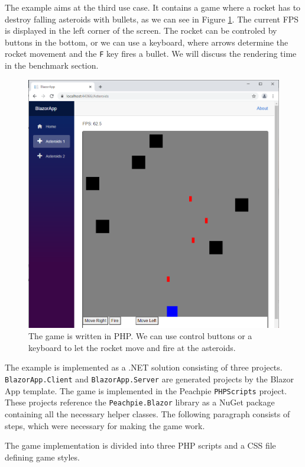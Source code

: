 The example aims at the third use case.
It contains a game where a rocket has to destroy falling asteroids with bullets, as we can see in Figure \ref{img28:game}.
The current \ac{FPS} is displayed in the left corner of the screen.
The rocket can be controled by buttons in the bottom, or we can use a keyboard, where arrows determine the rocket movement and the \texttt{F} key fires a bullet.
We will discuss the rendering time in the benchmark section.
\par
\begin{figure}
\centering
\includegraphics[scale=0.5]{./img/Asteroids}
\caption{The game is written in PHP. We can use control buttons or a keyboard to let the rocket move and fire at the asteroids.}
\label{img28:game}
\end{figure} 
\par
The example is implemented as a .NET solution consisting of three projects. 
\texttt{BlazorApp.Client} and \texttt{BlazorApp.Server} are generated projects by the Blazor App template.
The game is implemented in the Peachpie \texttt{PHPScripts} project.
These projects reference the \texttt{Peachpie.Blazor} library as a NuGet package containing all the necessary helper classes. 
The following paragraph consists of steps, which were necessary for making the game work.
\par
The game implementation is divided into three PHP scripts and a CSS file defining game styles.
